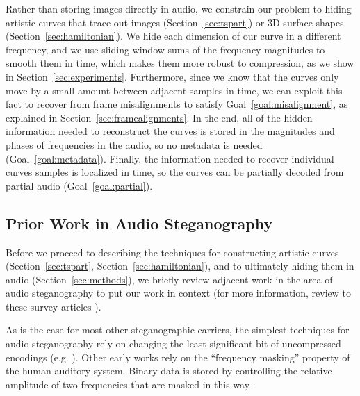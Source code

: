 \documentclass[runningheads]{llncs}
\begin{document}
Rather than storing images directly in audio, we constrain our problem to hiding artistic curves that trace out images (Section~\ref{sec:tspart}) or 3D surface shapes (Section~\ref{sec:hamiltonian}).  We hide each dimension of our curve in a different frequency, and we use sliding window sums of the frequency magnitudes to smooth them in time, which makes them more robust to compression, as we show in Section~\ref{sec:experiments}.  Furthermore, since we know that the curves only move by a small amount between adjacent samples in time, we can exploit this fact to recover from frame misalignments to satisfy Goal~\ref{goal:misalignment}, as explained in Section~\ref{sec:framealignments}.  In the end, all of the hidden information needed to reconstruct the curves is stored in the magnitudes and phases of frequencies in the audio, so no metadata is needed (Goal~\ref{goal:metadata}).  Finally, the information needed to recover individual curves samples is localized in time, so the curves can be partially decoded from partial audio (Goal~\ref{goal:partial}).


\subsection{Prior Work in Audio Steganography}
\label{sec:priorwork}

Before we proceed to describing the techniques for constructing artistic curves (Section~\ref{sec:tspart}, Section~\ref{sec:hamiltonian}), and to ultimately hiding them in audio (Section~\ref{sec:methods}), we briefly review adjacent work in the area of audio steganography to put our work in context (for more information, review to these survey articles \cite{djebbar_comparative_2012, dutta_overview_2020}).

As is the case for most other steganographic carriers, the simplest techniques for audio steganography rely on changing the least significant bit of uncompressed encodings (e.g. \cite{cvejic_wavelet_2002}).  Other early works rely on the ``frequency masking'' property of the human auditory system.  Binary data is stored by controlling the relative amplitude of two frequencies that are masked in this way \cite{gopalan_unified_2009, gopalan2004audio}.
\end{document}
